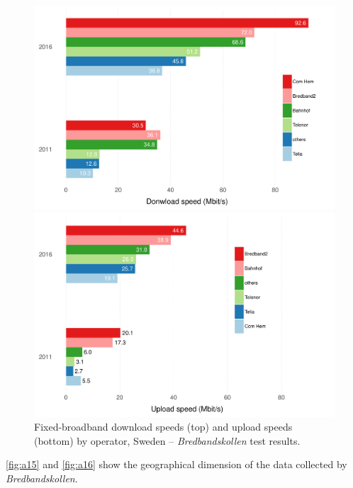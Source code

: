 \documentclass[12pt]{article}
\begin{document}
\begin{figure}[H]
   \begin{minipage}{0.8\textwidth}
        \centering
        \includegraphics[width=\textwidth]{comparison_dwlspeeds_byop.pdf} 
		
		\vspace{1cm}
		        
        \includegraphics[width=\textwidth]{comparison_uplspeeds_byop.pdf}
    \end{minipage}
        \caption{Fixed-broadband download speeds (top) and upload speeds (bottom) by operator, Sweden -- \textit{Bredbandskollen} test results.}
        \label{fig:a14}
\end{figure}   

\autoref{fig:a15} and \autoref{fig:a16} show the geographical dimension of the data collected by \textit{Bredbandskollen}.      
\end{document}
